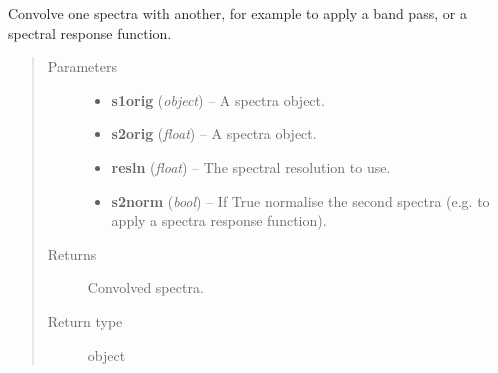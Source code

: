 \documentclass[letterpaper,10pt,english]{sphinxmanual}
\begin{document}
\begin{fulllineitems}
\label{source/sentinel_simulator:sentinel_simulator.spectra.convolve}
Convolve one spectra with another, for example
to apply a band pass, or a spectral response function.
\begin{quote}\begin{description}
\item[{Parameters}] \leavevmode\begin{itemize}
\item {} 
\textbf{s1orig} (\emph{object}) -- A spectra object.

\item {} 
\textbf{s2orig} (\emph{float}) -- A spectra object.

\item {} 
\textbf{resln} (\emph{float}) -- The spectral resolution to use.

\item {} 
\textbf{s2norm} (\emph{bool}) -- If True normalise the second spectra (e.g. to apply a spectra response function).

\end{itemize}

\item[{Returns}] \leavevmode
Convolved spectra.

\item[{Return type}] \leavevmode
object

\end{description}\end{quote}

\end{fulllineitems}


\begin{fulllineitems}
\label{source/sentinel_simulator:sentinel_simulator.spectra.sentinel2}
\end{fulllineitems}

\end{document}
